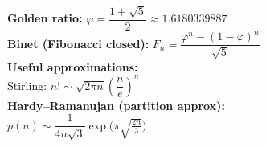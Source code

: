 \textbf{Golden ratio:} $\varphi=\dfrac{1+\sqrt5}{2}\approx1.6180339887$ \\[1mm]
\textbf{Binet (Fibonacci closed):} $F_n=\dfrac{\varphi^n-(1-\varphi)^n}{\sqrt5}$ \\[1mm]

\textbf{Useful approximations:} \\[1mm]
Stirling: $n! \sim \sqrt{2\pi n}\left(\dfrac{n}{e}\right)^n$ \\

\textbf{Hardy--Ramanujan (partition approx):} \\[1mm]
$p(n)\sim \dfrac{1}{4n\sqrt{3}}\exp\!\big(\pi\sqrt{\tfrac{2n}{3}}\big)$ \\